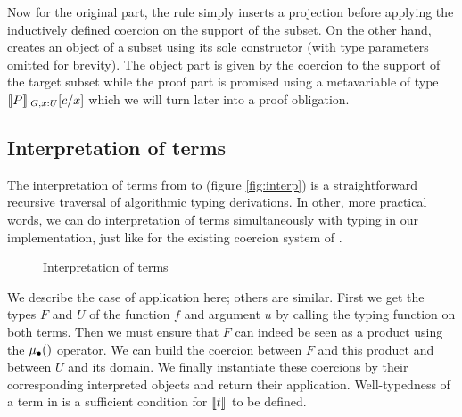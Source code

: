 \documentclass{llncs}
\begin{document}
Now for the original part, the  rule simply inserts a
projection before applying the inductively defined coercion on the
support of the subset. On the other hand,  creates an
object of a subset using its sole constructor  (with type
parameters omitted for brevity). The object
part is given by the coercion to the support of the target subset
while the proof part is promised using a metavariable of type $\llbracket P \rrbracket_{`G, x : U}[c/x]$ which
we will turn later into a proof obligation. 

\subsection{Interpretation of terms}
The interpretation of terms from \Russell to \CICq (figure
\vref{fig:interp}) is a straightforward
recursive traversal of algorithmic typing derivations. In other, more
practical words, we can do interpretation of terms simultaneously with
typing in our implementation, just like for the existing coercion system
of \Coq. 
\begin{figure}[ht]  
  \interparr  
  \caption{Interpretation of terms}
  \label{fig:interp}  
\end{figure}
We describe the case of application here; others are similar. First we
get the \Russell types $F$ and $U$ of the function $f$ and argument $u$ by calling the
typing function on both terms. Then we must ensure that $F$ can indeed
be seen as a product using the $\mualgo$ operator. We can build
the coercion between $F$ and this product and between $U$ and its
domain. We finally instantiate these coercions by their corresponding
interpreted objects and return their application.
Well-typedness of a term in \Russell is a sufficient condition for
$\llbracket t \rrbracket_{}$ to be defined.
\end{document}
